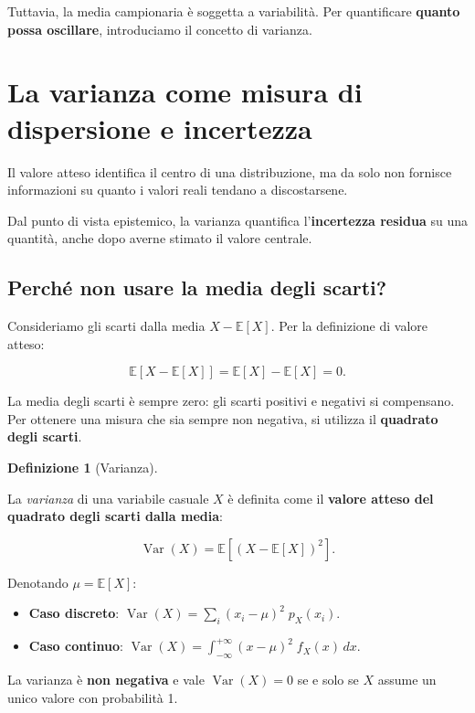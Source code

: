 \documentclass[
  italian,
  letterpaper,
  a4paper,
  11pt,
  open=any]{scrbook}
\providecommand{\tightlist}{%
  \setlength{\itemsep}{0pt}\setlength{\parskip}{0pt}}
\theoremstyle{plain}
\theoremstyle{definition}
\theoremstyle{definition}
\newtheorem{definition}{Definizione}[chapter]
\theoremstyle{remark}
\begin{document}
Tuttavia, la media campionaria è soggetta a variabilità. Per
quantificare \textbf{quanto possa oscillare}, introduciamo il concetto
di varianza.

\section{La varianza come misura di dispersione e
incertezza}\label{sec-variance}

Il valore atteso identifica il centro di una distribuzione, ma da solo
non fornisce informazioni su quanto i valori reali tendano a
discostarsene.

Dal punto di vista epistemico, la varianza quantifica
l'\textbf{incertezza residua} su una quantità, anche dopo averne stimato
il valore centrale.

\subsection{Perché non usare la media degli
scarti?}\label{perchuxe9-non-usare-la-media-degli-scarti}

Consideriamo gli scarti dalla media \(X - \mathbb{E}[X]\). Per la
definizione di valore atteso:

\[
\mathbb{E}[X - \mathbb{E}[X]] = \mathbb{E}[X] - \mathbb{E}[X] = 0.
\]

La media degli scarti è sempre zero: gli scarti positivi e negativi si
compensano. Per ottenere una misura che sia sempre non negativa, si
utilizza il \textbf{quadrato degli scarti}.

\begin{definition}[Varianza]\protect\hypertarget{def-variance}{}\label{def-variance}

La \emph{varianza} di una variabile casuale \(X\) è definita come il
\textbf{valore atteso del quadrato degli scarti dalla media}:

\[
\operatorname{Var}(X) = \mathbb{E}\!\left[(X - \mathbb{E}[X])^2\right].
\]

Denotando \(\mu = \mathbb{E}[X]\):

\begin{itemize}
\tightlist
\item
  \textbf{Caso discreto}:
  \(\operatorname{Var}(X) = \sum_i (x_i - \mu)^2 \; p_X(x_i)\).
\item
  \textbf{Caso continuo}:
  \(\operatorname{Var}(X) = \int_{-\infty}^{+\infty} (x - \mu)^2 \; f_X(x) \, dx\).
\end{itemize}

La varianza è \textbf{non negativa} e vale \(\operatorname{Var}(X)=0\)
se e solo se \(X\) assume un unico valore con probabilità 1.

\end{definition}
\end{document}
